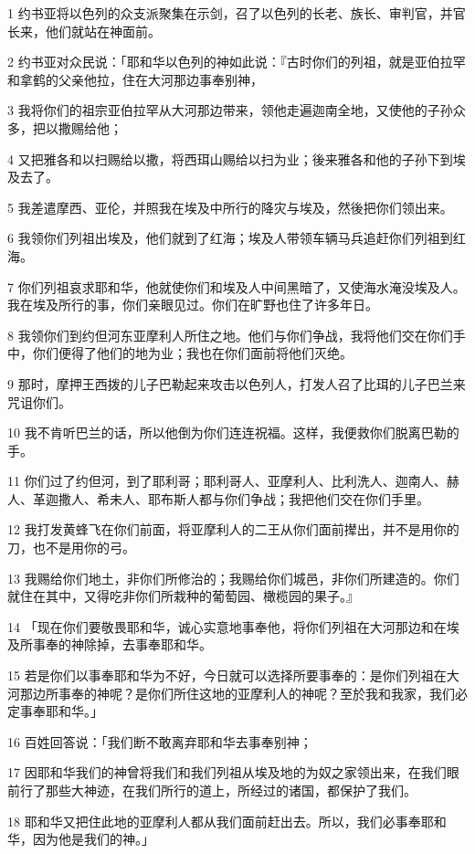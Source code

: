 \par 1 约书亚将以色列的众支派聚集在示剑，召了以色列的长老、族长、审判官，并官长来，他们就站在神面前。
\par 2 约书亚对众民说：「耶和华以色列的神如此说：『古时你们的列祖，就是亚伯拉罕和拿鹤的父亲他拉，住在大河那边事奉别神，
\par 3 我将你们的祖宗亚伯拉罕从大河那边带来，领他走遍迦南全地，又使他的子孙众多，把以撒赐给他；
\par 4 又把雅各和以扫赐给以撒，将西珥山赐给以扫为业；後来雅各和他的子孙下到埃及去了。
\par 5 我差遣摩西、亚伦，并照我在埃及中所行的降灾与埃及，然後把你们领出来。
\par 6 我领你们列祖出埃及，他们就到了红海；埃及人带领车辆马兵追赶你们列祖到红海。
\par 7 你们列祖哀求耶和华，他就使你们和埃及人中间黑暗了，又使海水淹没埃及人。我在埃及所行的事，你们亲眼见过。你们在旷野也住了许多年日。
\par 8 我领你们到约但河东亚摩利人所住之地。他们与你们争战，我将他们交在你们手中，你们便得了他们的地为业；我也在你们面前将他们灭绝。
\par 9 那时，摩押王西拨的儿子巴勒起来攻击以色列人，打发人召了比珥的儿子巴兰来咒诅你们。
\par 10 我不肯听巴兰的话，所以他倒为你们连连祝福。这样，我便救你们脱离巴勒的手。
\par 11 你们过了约但河，到了耶利哥；耶利哥人、亚摩利人、比利洗人、迦南人、赫人、革迦撒人、希未人、耶布斯人都与你们争战；我把他们交在你们手里。
\par 12 我打发黄蜂飞在你们前面，将亚摩利人的二王从你们面前撵出，并不是用你的刀，也不是用你的弓。
\par 13 我赐给你们地土，非你们所修治的；我赐给你们城邑，非你们所建造的。你们就住在其中，又得吃非你们所栽种的葡萄园、橄榄园的果子。』
\par 14 「现在你们要敬畏耶和华，诚心实意地事奉他，将你们列祖在大河那边和在埃及所事奉的神除掉，去事奉耶和华。
\par 15 若是你们以事奉耶和华为不好，今日就可以选择所要事奉的：是你们列祖在大河那边所事奉的神呢？是你们所住这地的亚摩利人的神呢？至於我和我家，我们必定事奉耶和华。」
\par 16 百姓回答说：「我们断不敢离弃耶和华去事奉别神；
\par 17 因耶和华我们的神曾将我们和我们列祖从埃及地的为奴之家领出来，在我们眼前行了那些大神迹，在我们所行的道上，所经过的诸国，都保护了我们。
\par 18 耶和华又把住此地的亚摩利人都从我们面前赶出去。所以，我们必事奉耶和华，因为他是我们的神。」
